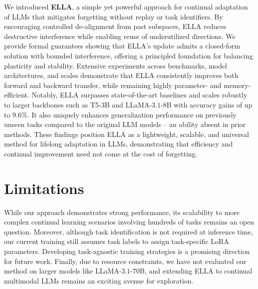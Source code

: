 \documentclass[11pt]{article}
\begin{document}
We introduced \textbf{ELLA}, a simple yet powerful approach for continual adaptation of LLMs that mitigates 
forgetting without replay or task identifiers. By encouraging controlled de-alignment from past subspaces, 
ELLA reduces destructive interference while enabling reuse of underutilized directions. We provide formal 
guarantees showing that ELLA’s update admits a closed-form solution with bounded interference, offering a principled foundation for balancing plasticity and stability. Extensive experiments across benchmarks, model architectures, and scales demonstrate that ELLA consistently improves both forward and backward transfer, while remaining highly parameter- and memory-efficient. Notably, ELLA surpasses state-of-the-art baselines and scales robustly to larger backbones such as T5-$3$B and LLaMA-$3.1$-$8$B with accuracy
gains of up to $9.6\%$. It also uniquely enhances generalization performance on previously unseen tasks compared to the original LLM models -- an ability absent in prior methods. These findings position ELLA as a lightweight, scalable, and universal method for lifelong adaptation in LLMs, demonstrating that efficiency and continual improvement need not come at the cost of forgetting.


\section{Limitations} While our approach demonstrates strong performance, its scalability to more complex continual learning scenarios involving hundreds of tasks remains an open question. Moreover, although task identification is not required at inference time, our current training still assumes task labels to assign task-specific LoRA parameters. Developing task-agnostic training strategies is a promising direction for future work. Finally, due to resource constraints, we have not evaluated our method on larger models like LLaMA-$3.1$-$70$B, and extending ELLA to continual multimodal LLMs remains an exciting avenue for exploration.
\end{document}
